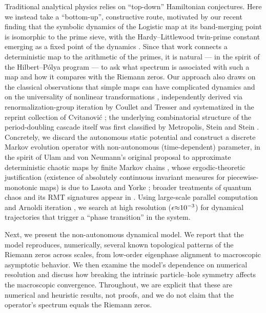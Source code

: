 \documentclass[fractalfract,article,submit,oneauthor,pdftex]{Definitions/mdpi}
\begin{document}
Traditional analytical physics relies on ``top-down'' Hamiltonian
conjectures. Here we instead take a ``bottom-up'', constructive route,
motivated by our recent finding that the symbolic dynamics of the
Logistic map at its band-merging point is isomorphic to the prime sieve,
with the Hardy--Littlewood twin-prime constant emerging as a fixed point
of the dynamics \cite{wang2026}. Since that work connects a deterministic
map to the arithmetic of the primes, it is natural --- in the spirit of
the Hilbert--P\'olya program --- to ask what spectrum is associated with
such a map and how it compares with the Riemann zeros. Our approach also
draws on the classical observations that simple maps can have complicated
dynamics \cite{may1976,liyorke1975} and on the universality of nonlinear transformations
\cite{feigenbaum1978}, independently derived via renormalization-group
iteration by Coullet and Tresser \cite{coullettresser1978} and
systematized in the reprint collection of Cvitanovi\'c
\cite{cvitanovic1984}; the underlying combinatorial structure of the
period-doubling cascade itself was first classified by Metropolis, Stein
and Stein \cite{metropolis1973}. Concretely, we discard the autonomous static potential
and construct a discrete Markov evolution operator with non-autonomous
(time-dependent) parameter, in the spirit of Ulam and von Neumann's original
proposal to approximate deterministic chaotic maps by finite Markov chains
\cite{ulam1947,ulam1960}, whose ergodic-theoretic justification (existence of
absolutely continuous invariant measures for piecewise-monotonic maps) is due
to Lasota and Yorke \cite{lasotayorke1973}; broader treatments of quantum
chaos and its RMT signatures appear in \cite{gutzwiller1990,casati1995}. Using large-scale parallel computation and
Arnoldi iteration \cite{arpack1998}, we search at high resolution
(\(\text{\ensuremath{\epsilon}\ensuremath{\approx}}\text{10}^{\text{\ensuremath{-}3}}\)) for dynamical trajectories that
trigger a ``phase transition'' in the system.

Next, we present the non-autonomous dynamical model. We report that the
model reproduces, numerically, several known topological patterns of the
Riemann zeros across scales, from low-order eigenphase alignment to
macroscopic asymptotic behavior. We then examine the model's dependence
on numerical resolution and discuss how breaking the intrinsic
particle--hole symmetry affects the macroscopic convergence. Throughout,
we are explicit that these are numerical and heuristic results, not
proofs, and we do not claim that the operator's spectrum equals the
Riemann zeros.
\end{document}
